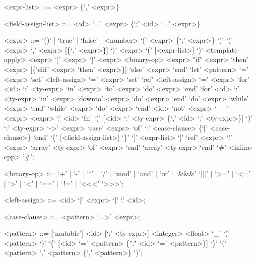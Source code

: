 \documentclass{sigplanconf}
\begin{document}
\begin{grammar}
<expr-list>         ::= <expr> \{`,' <expr>\}

<field-assign-list> ::= <id> `=' <expr> \{`;' <id> `=' <expr>\}

<expr>              ::= `()' | `true' | `false' | <number>
                     \alt  `(' <expr> \{`;' <expr>\} `)'
                     \alt  `(' <expr> `,' <expr> [\{`,' <expr>\}] `)'
                     \alt  <expr> `(' [<expr-list>] `)'
                      <template-apply>
                     \alt  <expr> `[' <expr> `]'
                     \alt  <expr> <binary-op> <expr>
                     \alt  "if" <expr> `then' <expr> [\{`elif' <expr> `then' <expr>\}] `else' <expr> `end'
                     \alt  `let' <pattern> `=' <expr>
                     \alt  `set' <left-assign> `=' <expr>
                     \alt  `set' `ref' <left-assign> `=' <expr>
                     \alt  `for' <id> `:' <ty-expr> `in' <expr> `to' <expr> `do' <expr> `end'
                     \alt  `for' <id> `:' <ty-expr> `in' <expr> `downto' <expr> `do' <expr> `end'
                     \alt  `do' <expr> `while' <expr> `end'
                     \alt  `while' <expr> `do' <expr> `end'
                     \alt  <id>
                     \alt  `not' <expr>
                     \alt  `~~~' <expr>
                     \alt  <expr> `.' <id>
                     \alt  `fn' `(' [<id> `:' <ty-expr> \{`,' <id> `:' <ty-expr>\}] `)' `:' <ty-expr> `->' <expr>
                     \alt  `case' <expr> `of' `|' <case-clause> \{`|' <case-clause>\} `end'
                      `\{' [<field-assign-list>] `\}'
                     \alt  `[' <expr-list> `]'
                     \alt  `ref' <expr>
                     \alt  `!' <expr>
                     \alt  `array' <ty-expr> `of' <expr> `end'
                     \alt  `array' <ty-expr> `end'
                     \alt  `#' <inline-cpp> `#';

<binary-op>         ::= `+' | `-' | `*' | `/' | `mod' | `and' | `or' | `&&&'
                     \alt  `|||' | `>=' | `<=' | `>' | `<' | `==' | `!=' | `<<<'
                     \alt  `>>>';

<left-assign>       ::= <id>
                      `[' <expr> `]'
                      `.' <id>;

<case-clause>       ::= <pattern> `=>' <expr>;

<pattern>           ::= [`mutable'] <id> [`:' <ty-expr>]
                     \alt  <integer>
                     \alt  <float>
                     \alt  `_'
                      `(' <pattern> `)'
                      `\{' [<id> `=' <pattern> \{"," <id> `=' <pattern>\}] `\}'
                     \alt  `(' <pattern> `,' <pattern> \{`,' <pattern>\} `)';

\end{grammar}
\end{document}
